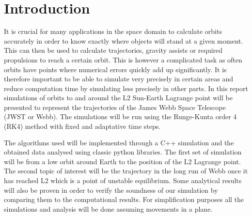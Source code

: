 \section{Introduction}
It is crucial for many applications in the space domain to calculate orbits accurately in order to know exactly where objects will stand at a given moment. This can then be used to calculate trajectories, gravity assists or required propulsions to reach a certain orbit. This is however a complicated task as often orbits have points where numerical errors quickly add up significantly. It is therefore important to be able to simulate very precisely in certain areas and reduce computation time by simulating less precisely in other parts. In this report simulations of orbits to and around the L2 Sun-Earth Lagrange point will be presented to represent the trajectories of the James Webb Space Telescope (JWST or Webb). The simulations will be run using the Runge-Kunta order 4 (RK4) method with fixed and adaptative time steps.

The algorithms used will be implemented through a C++ simulation and the obtained data analysed using classic python libraries. The first set of simulation will be from a low orbit around Earth to the position of the L2 Lagrange point. The second topic of interest will be the trajectory in the long run of Webb once it has reached L2 which is a point of unstable equilibrium. Some analytical results will also be proven in order to verify the soundness of our simulation by comparing them to the computational results. For simplification purposes all the simulations and analysis will be done assuming movements in a plane.